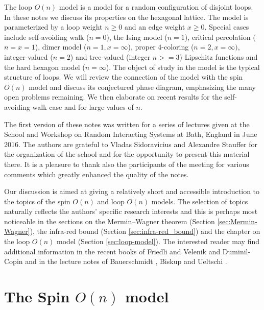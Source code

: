 \documentclass[12pt,reqno]{article}
\begin{document}
The loop $O(n)$ model is a model for a random configuration of
disjoint loops. In these notes we discuss its properties on the
hexagonal lattice. The model is parameterized by a loop weight $n\ge
0$ and an edge weight $x\ge 0$.
Special cases include self-avoiding walk ($n=0$), the Ising model
($n=1$), critical percolation ($n=x=1$), dimer model ($n=1,
x=\infty$), proper $4$-coloring ($n=2, x=\infty)$, integer-valued
($n=2$) and tree-valued (integer $n>=3$) Lipschitz functions and the
hard hexagon model ($n=\infty$). The object of study in the model is
the typical structure of loops. We will review the connection of the
model with the spin $O(n)$ model and discuss its conjectured phase
diagram, emphasizing the many open problems remaining. We then
elaborate on recent results for the self-avoiding walk case and for
large values of $n$.

The first version of these notes was written for a series of lectures given at the School and
Workshop on Random Interacting Systems at Bath, England in June
2016. The authors are grateful to Vladas Sidoravicius and Alexandre
Stauffer for the organization of the school and for the opportunity
to present this material there. It is a pleasure to thank also the
participants of the meeting for various comments which greatly
enhanced the quality of the notes.

Our discussion is aimed at giving a relatively short and accessible introduction to the topics of the spin $O(n)$ and loop $O(n)$ models. The selection of topics naturally reflects the authors' specific research interests and this is perhaps most noticeable in the sections on the Mermin--Wagner theorem (Section \ref{sec:Mermin-Wagner}), the infra-red bound (Section \ref{sec:infra-red_bound}) and the chapter on the loop $O(n)$ model (Section \ref{sec:loop-model}).
The interested reader may find additional information in the recent books of Friedli and Velenik \cite{friedli2016statistical} and Duminil-Copin \cite{duminil2013parafermionic} and in the lecture notes of Bauerschmidt \cite{Bauerschmidt2016}, Biskup \cite{biskup2009reflection} and Ueltschi \cite{Ueltschi2013}.

\section{The Spin $O(n)$ model}
\label{sec:spin-O-n}
\end{document}
